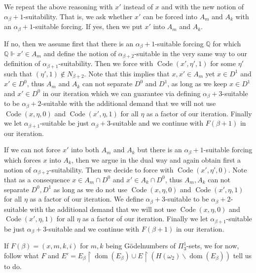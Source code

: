 \documentclass[a4paper,11pt]{article}
\newcommand{\forceQ}{\mathbb{Q}}
\begin{document}
{We repeat the above reasoning with $x'$ instead of $x$ and with the new notion of $\alpha_{\beta}+1$-suitability.
That is, we ask whether $x'$ can be forced into $A_m$ and $A_k$ with an $\alpha_{\beta}+1$-suitable forcing. If yes, then we put $x'$ into $A_m$ and $A_k$. 

If no, then we assume first that there is an $\alpha_{\beta}+1$-suitable forcing $\forceQ$ for which $\forceQ \Vdash x' \in A_m$ and define the notion of $\alpha_{\beta+2}$-suitable in the very same way to our definition of $\alpha_{\beta+1}$-suitability.
Then we force with $\operatorname{Code} (x',\eta',1)$ for some $\eta'$ such that $(\eta',1) \notin N_{\beta+2}$. Note that this implies that $x,x' \in A_m$ yet $x \in D^1$ and $x' \in D^0$, thus $A_m$ and $A_k$ can not separate $D^0$ and $D^1$, as long as we keep $x \in D^1$ and $x' \in D^0$ in our iteration which we can guarantee via defining $\alpha_{\beta}+3$-suitable to be
$\alpha_{\beta}+2$-suitable with the additional demand that we will not use $\operatorname{Code} (x,\eta,0)$ and $\operatorname{Code}(x',\eta,1)$ for all $\eta$ as a factor of our iteration. Finally we let $\alpha_{\beta+1}$-suitable  be just $\alpha_{\beta}+3$-suitable and we continue with $F(\beta+1)$ in our iteration.

If we can not force $x'$ into both $A_m$ and $A_k$ but there is an $\alpha_{\beta}+1$-suitable forcing which forces $x$ into $A_k$, then we argue in the dual way and again obtain first a notion of $\alpha_{\beta+2}$-suitability. Then we decide to force with $\operatorname{Code} (x',\eta',0)$. Note that as a consequence
$x \in A_m \cap D^0$ and $x' \in A_k \cap D^0$, thus $A_m, A_k$ can not separate $D^0,D^1$ as long as we do not use $\operatorname{Code} (x,\eta,0)$ and $\operatorname{Code}(x',\eta,1)$ for all $\eta$ as a factor of our iteration. We define $\alpha_{\beta}+3$-suitable to be
$\alpha_{\beta}+2$-suitable with the additional demand that we will not use $\operatorname{Code} (x,\eta,0)$ and $\operatorname{Code}(x',\eta,1)$ for all $\eta$ as a factor of our iteration. Finally we let $\alpha_{\beta+1}$-suitable  be just $\alpha_{\beta}+3$-suitable and we continue with $F(\beta+1)$ in our iteration.
 




If $F(\beta)= (x,m,k,i)$ for $m,k$ being G\"odelnumbers of $\Pi^1_3$-sets, we for now, follow what $F$ and $E'=E_{\beta} \upharpoonright \operatorname{dom} (E_{\beta}) \cup E \upharpoonright ( H(\omega_2) \backslash \operatorname{dom} (E_{\beta} )) $ tell us to do.

}
\end{document}
